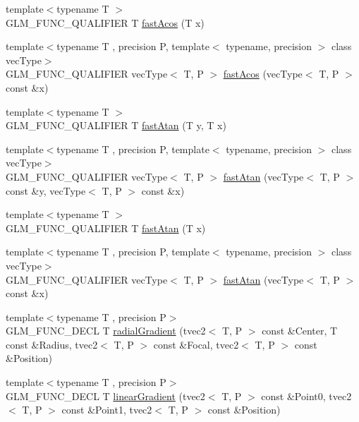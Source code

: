\begin{DoxyCompactItemize}
\item 
{\footnotesize template$<$typename T $>$ }\\G\+L\+M\+\_\+\+F\+U\+N\+C\+\_\+\+Q\+U\+A\+L\+I\+F\+I\+E\+R T \hyperlink{group__gtx__fast__trigonometry_ga9721d63356e5d94fdc4b393a426ab26b}{fast\+Acos} (T x)
\item 
{\footnotesize template$<$typename T , precision P, template$<$ typename, precision $>$ class vec\+Type$>$ }\\G\+L\+M\+\_\+\+F\+U\+N\+C\+\_\+\+Q\+U\+A\+L\+I\+F\+I\+E\+R vec\+Type$<$ T, P $>$ \hyperlink{namespaceglm_a297ec5f203c6fec20424ef3703771067}{fast\+Acos} (vec\+Type$<$ T, P $>$ const \&x)
\item 
{\footnotesize template$<$typename T $>$ }\\G\+L\+M\+\_\+\+F\+U\+N\+C\+\_\+\+Q\+U\+A\+L\+I\+F\+I\+E\+R T \hyperlink{group__gtx__fast__trigonometry_ga8d197c6ef564f5e5d59af3b3f8adcc2c}{fast\+Atan} (T y, T x)
\item 
{\footnotesize template$<$typename T , precision P, template$<$ typename, precision $>$ class vec\+Type$>$ }\\G\+L\+M\+\_\+\+F\+U\+N\+C\+\_\+\+Q\+U\+A\+L\+I\+F\+I\+E\+R vec\+Type$<$ T, P $>$ \hyperlink{namespaceglm_ae44077649af44bfe95fab2d4576c5dbe}{fast\+Atan} (vec\+Type$<$ T, P $>$ const \&y, vec\+Type$<$ T, P $>$ const \&x)
\item 
{\footnotesize template$<$typename T $>$ }\\G\+L\+M\+\_\+\+F\+U\+N\+C\+\_\+\+Q\+U\+A\+L\+I\+F\+I\+E\+R T \hyperlink{group__gtx__fast__trigonometry_gae25de86a968490ff56856fa425ec9d30}{fast\+Atan} (T x)
\item 
{\footnotesize template$<$typename T , precision P, template$<$ typename, precision $>$ class vec\+Type$>$ }\\G\+L\+M\+\_\+\+F\+U\+N\+C\+\_\+\+Q\+U\+A\+L\+I\+F\+I\+E\+R vec\+Type$<$ T, P $>$ \hyperlink{namespaceglm_a89520a2015e9c9f5b1a202e7e4dcc7ea}{fast\+Atan} (vec\+Type$<$ T, P $>$ const \&x)
\item 
{\footnotesize template$<$typename T , precision P$>$ }\\G\+L\+M\+\_\+\+F\+U\+N\+C\+\_\+\+D\+E\+C\+L T \hyperlink{group__gtx__gradient__paint_ga166d43d567a4cf150579a92f69b0dc9f}{radial\+Gradient} (tvec2$<$ T, P $>$ const \&Center, T const \&Radius, tvec2$<$ T, P $>$ const \&Focal, tvec2$<$ T, P $>$ const \&Position)
\item 
{\footnotesize template$<$typename T , precision P$>$ }\\G\+L\+M\+\_\+\+F\+U\+N\+C\+\_\+\+D\+E\+C\+L T \hyperlink{group__gtx__gradient__paint_gacde26d5e0c4a1856467bded9dfad9040}{linear\+Gradient} (tvec2$<$ T, P $>$ const \&Point0, tvec2$<$ T, P $>$ const \&Point1, tvec2$<$ T, P $>$ const \&Position)

\end{DoxyCompactItemize}
